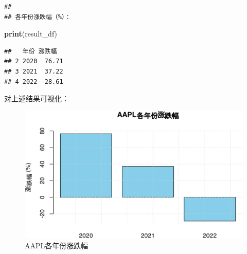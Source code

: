 \documentclass[]{ctexbook}
\newenvironment{Shaded}{\begin{snugshade}}{\end{snugshade}}
\newcommand{\AttributeTok}[1]{\textcolor[rgb]{0.13,0.29,0.53}{#1}}
\newcommand{\CommentTok}[1]{\textcolor[rgb]{0.56,0.35,0.01}{\textit{#1}}}
\newcommand{\ConstantTok}[1]{\textcolor[rgb]{0.56,0.35,0.01}{#1}}
\newcommand{\DecValTok}[1]{\textcolor[rgb]{0.00,0.00,0.81}{#1}}
\newcommand{\FunctionTok}[1]{\textcolor[rgb]{0.13,0.29,0.53}{\textbf{#1}}}
\newcommand{\NormalTok}[1]{#1}
\newcommand{\SpecialCharTok}[1]{\textcolor[rgb]{0.81,0.36,0.00}{\textbf{#1}}}
\newcommand{\StringTok}[1]{\textcolor[rgb]{0.31,0.60,0.02}{#1}}
\begin{document}
\begin{verbatim}
## 
## 各年份涨跌幅（%）：
\end{verbatim}

\begin{Shaded}
\begin{Highlighting}[]
\FunctionTok{print}\NormalTok{(result\_df)}
\end{Highlighting}
\end{Shaded}

\begin{verbatim}
##   年份 涨跌幅
## 2 2020  76.71
## 3 2021  37.22
## 4 2022 -28.61
\end{verbatim}

对上述结果可视化：

\begin{Shaded}
\end{Shaded}

\begin{figure}
\includegraphics[width=0.9\linewidth]{quantmod_files/figure-latex/yearreturns-1} \caption{AAPL各年份涨跌幅}\label{fig:yearreturns}
\end{figure}
\end{document}
